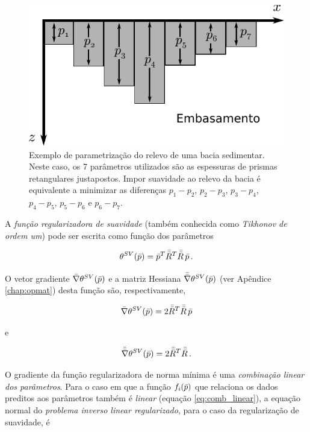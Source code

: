 \begin{example}
\begin{figure}
    \centering
    \includegraphics[scale=1]{figs/basin-smoothness}
    \caption{Exemplo de parametrização do relevo de uma bacia sedimentar.
    Neste caso, os 7 parâmetros utilizados são as espessuras de prismas
    retangulares justapostos. Impor suavidade ao relevo da bacia é equivalente
    a minimizar as diferenças $p_1 - p_2$, $p_2 - p_3$, $p_3 - p_4$, $p_4 - p_5$,
    $p_5 - p_6$ e $p_6 - p_7$.}
    \label{fig:basin-smoothness}
\end{figure}

\end{example}

\indent A {\it função regularizadora de suavidade} (também conhecida como
{\it Tikhonov de ordem um}) pode ser escrita como função dos
parâmetros

\begin{equation}
\theta^{SV}(\bar{p}) = \bar{p}^T \bar{\bar{R}}^T \bar{\bar{R}}\thinspace\bar{p} \thinspace .
\label{eq:suavidade}
\end{equation}

\noindent O vetor gradiente $\bar{\nabla}\theta^{SV}(\bar{p})$ e a matriz Hessiana
$\bar{\bar{\nabla}}\theta^{SV}(\bar{p})$ (ver Apêndice \ref{chap:opmat}) desta função
são, respectivamente,

\begin{equation}
\bar{\nabla}\theta^{SV}(\bar{p}) = 2\bar{\bar{R}}^T \bar{\bar{R}}\thinspace\bar{p}
\end{equation}

\noindent e

\begin{equation}
\bar{\bar{\nabla}}\theta^{SV}(\bar{p}) = 2\bar{\bar{R}}^T \bar{\bar{R}} \thinspace .
\end{equation}

\indent O gradiente da função regularizadora de norma mínima é uma
{\it combinação linear dos parâmetros}.
Para o caso em que a função $f_i(\bar{p})$ que relaciona
os dados preditos aos parâmetros também é {\it linear} (equação \ref{eq:comb_linear}),
a equação normal do {\it problema inverso linear regularizado},
para o caso da regularização de suavidade, é

